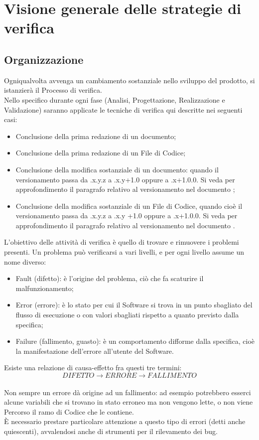 \section{Visione generale delle strategie di verifica}{
\subsection{Organizzazione}{
	Ogniqualvolta avvenga un cambiamento sostanziale nello sviluppo del prodotto, si istanzierà il Processo di verifica. \\
	Nello specifico durante ogni fase (Analisi, Progettazione, Realizzazione e Validazione) saranno applicate le tecniche di verifica qui descritte nei seguenti casi:
	\begin{itemize}
		\item Conclusione della prima redazione di un documento;
		\item Conclusione della prima redazione di un File di Codice;
		\item Conclusione della modifica sostanziale di un documento: quando il versionamento passa da .x.y.z a .x.y+1.0 oppure a .x+1.0.0. Si veda per approfondimento il paragrafo relativo al versionamento nel documento \href{run:../../Esterni/\fNormeDiProgetto}{\fEscapeNormeDiProgetto};
		\item Conclusione della modifica sostanziale di un File di Codice, quando cioè il versionamento passa da .x.y.z a .x.y +1.0 oppure a .x+1.0.0. Si veda per approfondimento il paragrafo relativo al versionamento nel documento \href{run:../../Esterni/\fNormeDiProgetto}{\fEscapeNormeDiProgetto}.
	\end{itemize}
	L'obiettivo delle attività di verifica è quello di trovare e rimuovere i problemi presenti. Un problema può verificarsi a vari livelli, e per ogni livello assume un nome diverso:
	\begin{itemize}
		\item Fault (difetto): è l'origine del problema, ciò che fa scaturire il malfunzionamento;
		\item Error (errore): è lo stato per cui il Software si trova in un punto sbagliato del flusso di esecuzione o con valori sbagliati rispetto a quanto previsto dalla specifica;
		\item Failure (fallimento, guasto): è un comportamento difforme dalla specifica, cioè la manifestazione dell'errore all'utente del Software.
	\end{itemize}
	Esiste una relazione di causa-effetto fra questi tre termini:\\
	\[DIFETTO\longrightarrow ERRORE\longrightarrow FALLIMENTO\]\\
	Non sempre un errore dà origine ad un fallimento: ad esempio potrebbero esserci alcune variabili che si trovano in stato erroneo ma non vengono lette, o non viene Percorso il ramo di Codice che le contiene.\\
	È necessario prestare particolare attenzione a questo tipo di errori (detti anche quiescenti), avvalendosi anche di strumenti per il rilevamento dei bug.
}
}
